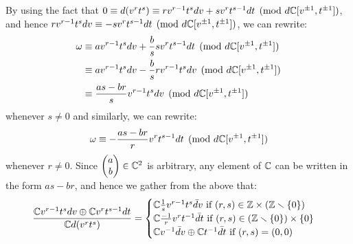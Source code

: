 \begin{example}
            By using the fact that $0 \equiv d(v^r t^s) \equiv r v^{r - 1} t^s dv + s v^r t^{s - 1} dt \pmod{d\mathbb{C}[v^{\pm 1}, t^{\pm 1}]}$, and hence $r v^{r - 1} t^s dv \equiv -s v^r t^{s - 1} dt \pmod{d\mathbb{C}[v^{\pm 1}, t^{\pm 1}]}$, we can rewrite:
                $$
                    \begin{aligned}
                        \omega & \equiv a v^{r - 1} t^s dv + \frac{b}{s} s v^r t^{s - 1} dt \pmod{d\mathbb{C}[v^{\pm 1}, t^{\pm 1}]}
                        \\
                        & \equiv a v^{r - 1} t^s dv - \frac{b}{s} r v^{r - 1} t^s dv \pmod{d\mathbb{C}[v^{\pm 1}, t^{\pm 1}]}
                        \\
                        & \equiv \frac{as - br}{s} v^{r - 1} t^s dv \pmod{d\mathbb{C}[v^{\pm 1}, t^{\pm 1}]}
                    \end{aligned}
                $$
            whenever $s \not = 0$ and similarly, we can rewrite:
                $$\omega \equiv -\frac{as - br}{r} v^r t^{s - 1} dt \pmod{d\mathbb{C}[v^{\pm 1}, t^{\pm 1}]}$$
            whenever $r \not = 0$. Since $\begin{pmatrix}a \\ b\end{pmatrix} \in \mathbb{C}^2$ is arbitrary, any element of $\mathbb{C}$ can be written in the form $as - br$, and hence we gather from the above that:
                $$
                    \frac{ \bbC v^{r - 1} t^s dv \oplus \bbC v^r t^{s - 1} dt }{ \bbC d(v^r t^s) } =
                    \begin{cases}
                        \text{$\bbC \frac1s v^{r - 1} t^s \bar{d}v$ if $(r, s) \in \Z \x (\Z \setminus \{0\})$}
                        \\
                        \text{$\bbC \frac{-1}{r} v^r t^{-1} \bar{d}t$ if $(r, s) \in (\Z \setminus \{0\}) \x \{0\}$}
                        \\
                        \text{$\bbC v^{-1}\bar{d}v \oplus \bbC t^{-1} \bar{d}t$ if $(r, s) = (0, 0)$}
                    \end{cases}
                $$
            

\end{example}
